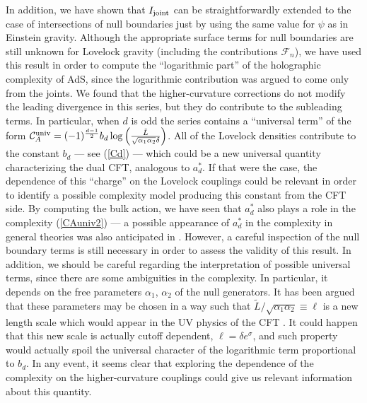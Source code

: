 \documentclass[11pt,letterpaper]{article}
\begin{document}
In addition, we have shown that $I_{\rm joint}$ can be straightforwardly extended to the case of intersections of null boundaries just by using the same value for $\psi$ as in Einstein gravity. Although the appropriate surface terms for null boundaries are still unknown for Lovelock gravity (including the contributions $\mathcal{F}_n$), we have used this result in order to compute the ``logarithmic part'' of the holographic complexity of AdS, since the logarithmic contribution was argued to come only from the joints. We found that the higher-curvature corrections do not modify the leading divergence in this series, but they do contribute to the subleading terms. In particular, when $d$ is odd the series contains a ``universal term'' of the form $\mathcal{C}_A^{\rm univ}=(-1)^{\frac{d-1}{2}}b_d \log\left(\frac{\tilde L}{\sqrt{\alpha_1\alpha_2}\delta}\right)$. All of the Lovelock densities contribute to the constant $b_d$ --- see (\ref{Cd}) --- which could be a new universal quantity characterizing the dual CFT, analogous to $a^*_d$. If that were the case, the dependence of this ``charge'' on the Lovelock couplings could be relevant in order to identify a possible complexity model producing this constant from the CFT side. By computing the bulk action, we have seen that $a^*_d$ also plays a role in the complexity (\ref{CAuniv2}) --- a possible appearance of $a_d^*$ in the complexity in general theories was also anticipated in \cite{Bueno:2018xqc}. However, a careful inspection of the null boundary terms is still necessary in order to assess the validity of this result. In addition, we should be careful regarding the interpretation of possible universal terms, since there are some ambiguities in the complexity. In particular, it depends on the free parameters $\alpha_1$, $\alpha_2$ of the null generators. It has been argued that these parameters may be chosen in a way such that $\tilde L/\sqrt{\alpha_1\alpha_2}\equiv\ell$ is a new length scale which would appear in the UV physics of the CFT \cite{Carmi:2016wjl}. It could happen that this new scale is actually cutoff dependent, $\ell=\delta e^{\sigma}$, and such property would actually spoil the universal character of the logarithmic term proportional to $b_d$.  In any event, it seems clear that exploring the dependence of the complexity on the higher-curvature couplings could give us relevant information about this quantity. 
\end{document}
